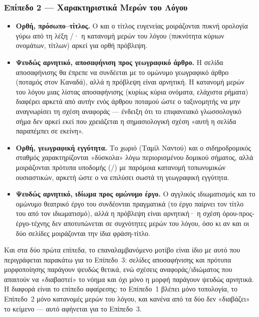 \subsubsection{Επίπεδο 2 --- Χαρακτηριστικά Μερών του Λόγου}

\begin{itemize}
  \item \textbf{Ορθή, πρόσωπο--τίτλος.} Ο  και ο τίτλος ευγενείας 
  μοιράζονται πυκνή ορολογία γύρω από τη λέξη /· η
  κατανομή μερών του λόγου (πυκνότητα κύριων ονομάτων, τίτλων) αρκεί για ορθή
  πρόβλεψη.
  \item \textbf{Ψευδώς αρνητικό, αποσαφήνιση προς γεωγραφικό άρθρο.} Η σελίδα
  αποσαφήνισης  θα έπρεπε να συνδέεται με το ομώνυμο γεωγραφικό
  άρθρο (ποταμός στον Καναδά), αλλά η πρόβλεψη είναι αρνητική. Η κατανομή μερών
  του λόγου μιας λίστας αποσαφήνισης (κυρίως κύρια ονόματα, ελάχιστα ρήματα)
  διαφέρει αρκετά από αυτήν ενός άρθρου ποταμού ώστε ο ταξινομητής να μην
  αναγνωρίσει τη σχέση αναφοράς --- ένδειξη ότι το επιφανειακό γλωσσολογικό
  σήμα δεν αρκεί εκεί που χρειάζεται η σημασιολογική σχέση «αυτή η σελίδα
  παραπέμπει σε εκείνη».
  \item \textbf{Ορθή, γεωγραφική εγγύτητα.} Το χωριό 
  (Ταμίλ Ναντού) και ο σιδηροδρομικός σταθμός  χαρακτηρίζονται
  «δύσκολα» λόγω περιορισμένου δομικού σήματος, αλλά μοιράζονται πρότυπα
  υποδομής (/) με παρόμοια κατανομή
  τοπωνυμικών ουσιαστικών, αρκετή ώστε ο  να επιλύσει σωστά τη
  γεωγραφική εγγύτητα.
  \item \textbf{Ψευδώς αρνητικό, ιδίωμα προς ομώνυμο έργο.} Ο αγγλικός
  ιδιωματισμός  και το ομώνυμο θεατρικό έργο του  συνδέονται πραγματικά (το έργο παίρνει τον τίτλο του από τον
  ιδιωματισμό), αλλά η πρόβλεψη είναι αρνητική· η σχέση όρου-προς-έργο-τέχνης
  δεν αποτυπώνεται σε συχνότητες μερών του λόγου, όσο κι αν και οι δύο σελίδες
  μοιράζονται την ίδια φράση-τίτλο.
\end{itemize}

Και στα δύο πρώτα επίπεδα, το επαναλαμβανόμενο μοτίβο είναι ίδιο με αυτό που
περιγράφεται παρακάτω για το Επίπεδο~3: σελίδες αποσαφήνισης και πρότυπα
μορφοποίησης παράγουν ψευδώς θετικά, ενώ σχέσεις αναφοράς/ιδιώματος που
απαιτούν να «διαβαστεί» το νόημα και όχι μόνο η μορφή παράγουν ψευδώς αρνητικά.
Η διαφορά είναι το επίπεδο αφαίρεσης: το Επίπεδο~1 βλέπει μόνο τοπολογία, το
Επίπεδο~2 μόνο κατανομές μερών του λόγου, και κανένα από τα δύο δεν «διαβάζει»
το κείμενο --- αυτό αφήνεται για το Επίπεδο~3.

